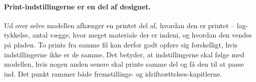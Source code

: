 \paragraph{Print-indstillingerne er en del af designet.}
Ud over selve modellen afhænger en printet del af, hvordan den er
printet -- lag-tykkelse, antal vægge, hvor meget materiale der er
indeni, og hvordan den vendes på pladen. To prints fra samme fil
kan derfor godt opføre sig forskelligt, hvis indstillingerne
ikke er de samme. Det betyder, at indstillingerne skal følge med
modellen, hvis nogen anden senere skal printe samme del og få den
til at passe ind. Det punkt rammer både fremstillings- og
idriftsættelses-kapitlerne.
